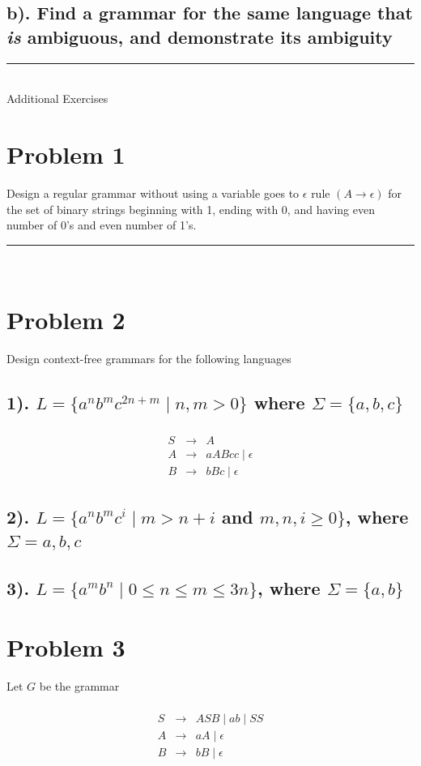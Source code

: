 \documentclass[20pt]{article} %
\begin{document}
\subsection{b). Find a grammar for the same language that \textit{is} ambiguous, and demonstrate its ambiguity}


\noindent\rule{15cm}{0.4pt} \\
Additional Exercises
\section{Problem 1}
Design a regular grammar without using a variable goes to $\epsilon$ rule $(A \rightarrow \epsilon)$ for the set of binary strings beginning with 1, ending with 0, and having even number of 0's and even number of 1's.
 \noindent\rule{2cm}{0.4pt} \\

\section{Problem 2}
Design context-free grammars for the following languages
\subsection{1). $L = \{ a^{n}b^{m}c^{2n+m} \mid n,m > 0\}$ where $\Sigma = \{a,b,c\}$}

 \begin{table}[!htbp]
 \[\begin{array}{ccc} 
&  \\
 S & \rightarrow & A \\
 A & \rightarrow & aABcc \mid \epsilon \\
 B & \rightarrow & bBc \mid \epsilon
 \end{array}\]
 \end{table}

\subsection{2). $L = \{a^{n}b^{m}c^{i} \mid m > n + i$ and $m,n,i \geq 0\}$, where $\Sigma = {a,b,c}$}
\subsection{3). $L = \{a^{m}b^{n} \mid 0 \leq n \leq m \leq 3n\}$, where $\Sigma = \{a,b\}$}

\section{Problem 3}
Let $G$ be the grammar
 \begin{table}[!htbp]
 \[\begin{array}{ccc} 
&  \\
 S & \rightarrow & ASB \mid ab \mid SS\\
 A & \rightarrow & aA \mid \epsilon \\
 B & \rightarrow  & bB \mid \epsilon \\
 \end{array}\]
 \end{table}
\end{document}
